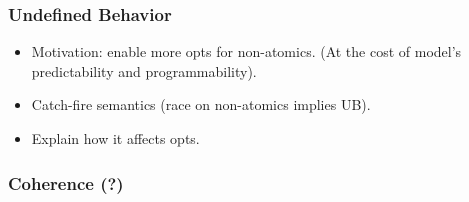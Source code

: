 \subsubsection{Undefined Behavior}
\label{sec:background:ub}

\begin{itemize}
  \item Motivation: enable more opts for non-atomics.
        (At the cost of model's predictability and programmability).
  \item Catch-fire semantics (race on non-atomics implies UB).
  \item Explain how it affects opts.
\end{itemize}

\subsubsection{Coherence (?)}
\label{sec:background:coh}


